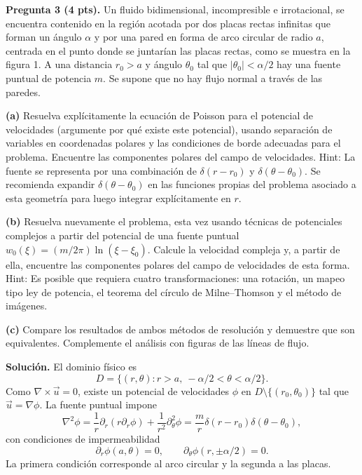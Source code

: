\documentclass[11pt]{article}
\begin{document}
\noindent\textbf{Pregunta 3 (4 pts).} Un fluido bidimensional, incompresible e irrotacional, se encuentra contenido en la región acotada por dos placas rectas infinitas que forman un ángulo $\alpha$ y por una pared en forma de arco circular de radio $a$, centrada en el punto donde se juntarían las placas rectas, como se muestra en la figura 1. A una distancia $r_0>a$ y ángulo $\theta_0$ tal que $|\theta_0|<\alpha/2$ hay una fuente puntual de potencia $m$. Se supone que no hay flujo normal a través de las paredes.

\textbf{(a)} Resuelva explícitamente la ecuación de Poisson para el potencial de velocidades (argumente por qué existe este potencial), usando separación de variables en coordenadas polares y las condiciones de borde adecuadas para el problema. Encuentre las componentes polares del campo de velocidades. Hint: La fuente se representa por una combinación de $\delta(r-r_0)$ y $\delta(\theta-\theta_0)$. Se recomienda expandir $\delta(\theta-\theta_0)$ en las funciones propias del problema asociado a esta geometría para luego integrar explícitamente en $r$.

\textbf{(b)} Resuelva nuevamente el problema, esta vez usando técnicas de potenciales complejos a partir del potencial de una fuente puntual $w_0(\xi)=(m/2\pi)\ln(\xi-\xi_0)$. Calcule la velocidad compleja y, a partir de ella, encuentre las componentes polares del campo de velocidades de esta forma. Hint: Es posible que requiera cuatro transformaciones: una rotación, un mapeo tipo ley de potencia, el teorema del círculo de Milne--Thomson y el método de imágenes.

\textbf{(c)} Compare los resultados de ambos métodos de resolución y demuestre que son equivalentes. Complemente el análisis con figuras de las líneas de flujo.

\noindent\textbf{Solución.}
El dominio físico es
\begin{equation}
D=\{(r,\theta): r>a,\ -\alpha/2<\theta<\alpha/2\}.
\label{eq:dominio}
\end{equation}
Como $\nabla\times\vec u=0$, existe un potencial de velocidades $\phi$ en $D\setminus\{(r_0,\theta_0)\}$ tal que $\vec u=\nabla\phi$. La fuente puntual impone
\begin{equation}
\nabla^2\phi=\frac1r\partial_r(r\partial_r\phi)+\frac1{r^2}\partial_\theta^2\phi
=\frac{m}{r}\delta(r-r_0)\delta(\theta-\theta_0),
\label{eq:poisson}
\end{equation}
con condiciones de impermeabilidad
\begin{equation}
\partial_r\phi(a,\theta)=0,
\qquad
\partial_\theta\phi(r,\pm\alpha/2)=0.
\label{eq:neumann}
\end{equation}
La primera condición corresponde al arco circular y la segunda a las placas.
\end{document}
